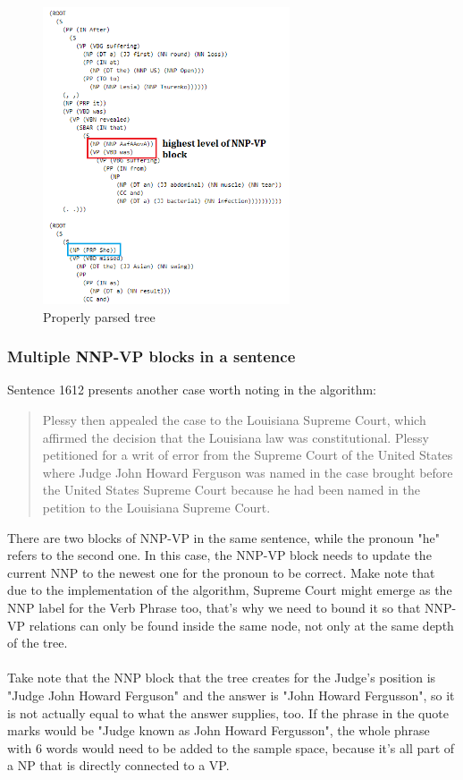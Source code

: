\documentclass{article}
\begin{document}
\begin{figure}[H]
    \centering
\includegraphics[width=0.65\textwidth]{Example4.png}
    \caption{Properly parsed tree}
\end{figure}

\subsubsection{Multiple NNP-VP blocks in a sentence}
Sentence 1612 presents another case worth noting in the algorithm:
\begin{quote}
    Plessy then appealed the case to the Louisiana Supreme Court, which affirmed the decision that the Louisiana law was constitutional. Plessy petitioned for a writ of error from the Supreme Court of the United States where Judge John Howard Ferguson was named in the case brought before the United States Supreme Court because he had been named in the petition to the Louisiana Supreme Court.
\end{quote}
There are two blocks of NNP-VP in the same sentence, while the pronoun "he" refers to the second one. In this case, the NNP-VP block needs to update the current NNP to the newest one for the pronoun to be correct. Make note that due to the implementation of the algorithm, Supreme Court might emerge as the NNP label for the Verb Phrase too, that's why we need to bound it so that NNP-VP relations can only be found inside the same node, not only at the same depth of the tree. \\ \\
Take note that the NNP block that the tree creates for the Judge's position is "Judge John Howard Ferguson" and the answer is "John Howard Fergusson", so it is not actually equal to what the answer supplies, too. If the phrase in the quote marks would be "Judge known as John Howard Fergusson", the whole phrase with 6 words would need to be added to the sample space, because it's all part of a NP that is directly connected to a VP.
\end{document}
